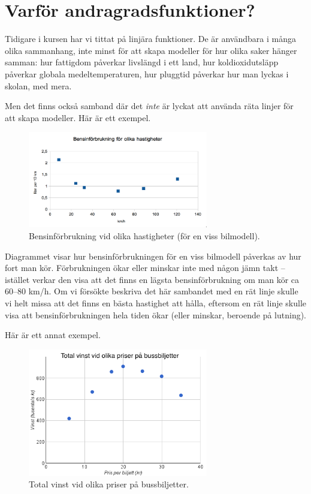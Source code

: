 \section{Varför andragradsfunktioner?}

Tidigare i kursen har vi tittat på linjära funktioner.
De är användbara i många olika sammanhang, inte minst för att skapa modeller för hur olika saker hänger samman:
hur fattigdom påverkar livslängd i ett land, hur koldioxidutsläpp påverkar globala medeltemperaturen, hur pluggtid påverkar hur man lyckas i skolan, med mera.

Men det finns också samband där det \emph{inte} är lyckat att använda räta linjer för att skapa modeller.
Här är ett exempel.

\begin{figure}
  \centering
  \includegraphics[width=0.7\textwidth]{bilder/bensinforbr.png}
  \caption{\label{fig:bensinforbr}Bensinförbrukning vid olika hastigheter (för en viss bilmodell).}
\end{figure}

Diagrammet visar hur bensinförbrukningen för en viss bilmodell påverkas av hur fort man kör.
Förbrukningen ökar eller minskar inte med någon jämn takt -- istället verkar den visa att det finns en lägsta bensinförbrukning om man kör ca 60--80 km/h.
Om vi försökte beskriva det här sambandet med en rät linje skulle vi helt missa att det finns en bästa hastighet att hålla, eftersom en rät linje skulle visa att bensinförbrukningen hela tiden ökar (eller minskar, beroende på lutning).

Här är ett annat exempel.

\begin{figure}
  \centering
  \includegraphics[width=0.7\textwidth]{bilder/busspriser.png}
  \caption{\label{fig:busspriser}Total vinst vid olika priser på bussbiljetter.}
\end{figure}

